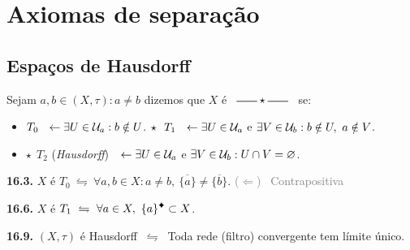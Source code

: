 \section{Axiomas de separação}

\subsection*{Espaços de Hausdorff}

\begin{definition}
    Sejam \(a, b \in (X,\tau) : a \neq b\) dizemos que \(X\) é  \ \(\rotatebox{90}{\Big|} \star \rotatebox{90}{\Big|} \) \ se:%
    \vspace{-0.3cm}
    \begin{itemize}[label = \(\star\), left = 1cm]
        \item \(T_0 \ \ \leftarrow \exists U \in \mathcal{U}_a : b \notin U\). \hfill \(\star \ \ T_1 \ \ \leftarrow \exists U \in \U_a\) e \(\exists V \in \mathcal{U}_b : b \notin U, \ a \notin V\).
        \item[]\hspace{1.8cm} \(\star \ \ T_2\) (\emph{Hausdorff}) \(\ \ \leftarrow \exists U \in \mathcal{U}_a\) e \(\exists V \in \mathcal{U}_b : U\cap V = \varnothing\).
    \end{itemize}
\end{definition}


\begin{proposition}
    \textbf{16.3.} \(X\) é \(T_0 \ \leftrightharpoons \ \forall a,b \in X : a \neq b, \ \overline{\{a\}}\neq \overline{\{b\}}\).  \textcolor{gray}{(\(\Leftarrow\)) \ Contrapositiva}
\end{proposition}

\begin{proposition}
    \textbf{16.6.} \(X\) é \(T_1 \ \leftrightharpoons \ \forall a \in X, \ \{a\}\ce \subset X\).  
\end{proposition}

\begin{proposition}
    \textbf{16.9.} \((X, \tau)\) é Hausdorff \(\ \leftrightharpoons \ \) Toda rede (filtro) convergente tem  límite único. 
\end{proposition}

